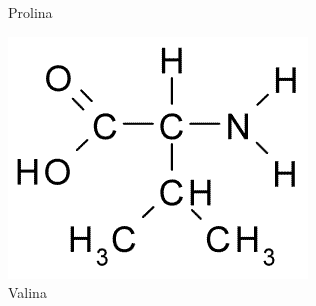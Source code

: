 \begin{figure}[H]
\begin{center}
\begin{minipage}{0.24\linewidth}
			\caption{Prolina}
			\label{fig:proline}
		\end{minipage}
		\begin{minipage}{0.24\linewidth}
			\centering   
			\includegraphics[width=0.8\linewidth]{secProteins/figures/valine.png}
			\caption{Valina}
			\label{fig:valine}
		\end{minipage}
	\end{center}
\end{figure}
\vspace{-1cm}
